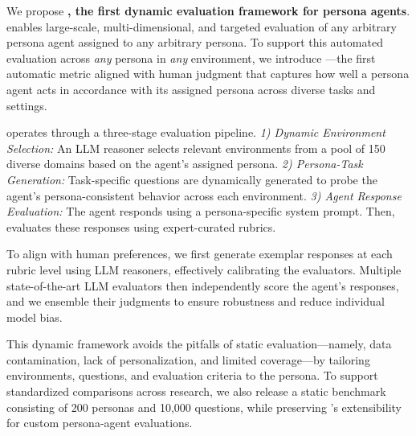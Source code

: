 We propose \textbf{\benchmark, the first dynamic evaluation framework for persona agents}.
\benchmark enables large-scale, multi-dimensional, and targeted evaluation of any arbitrary persona agent assigned to any arbitrary persona.
To support this automated evaluation across \textit{any} persona in \textit{any} environment, we introduce \textbf{\score}—the first automatic metric aligned with human judgment that captures how well a persona agent acts in accordance with its assigned persona across diverse tasks and settings.

\benchmark operates through a three-stage evaluation pipeline. \textit{1) Dynamic Environment Selection:} An LLM reasoner selects relevant environments from a pool of 150 diverse domains based on the agent's assigned persona.
\textit{2) Persona-Task Generation:} Task-specific questions are dynamically generated to probe the agent’s persona-consistent behavior across each environment.
\textit{3) Agent Response Evaluation:} The agent responds using a persona-specific system prompt. Then, \score evaluates these responses using expert-curated rubrics.

To align \score with human preferences, we first generate exemplar responses at each rubric level using LLM reasoners, effectively calibrating the evaluators. Multiple state-of-the-art LLM evaluators then independently score the agent’s responses, and we ensemble their judgments to ensure robustness and reduce individual model bias.


This dynamic framework avoids the pitfalls of static evaluation—namely, data contamination, lack of personalization, and limited coverage—by tailoring environments, questions, and evaluation criteria to the persona. 
To support standardized comparisons across research, we also release a static benchmark consisting of 200 personas and 10,000 questions, while preserving \benchmark's extensibility for custom persona-agent evaluations.


